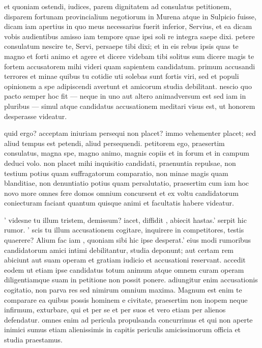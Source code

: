  et quoniam ostendi, iudices, parem dignitatem ad consulatus petitionem, disparem fortunam provincialium negotiorum in Murena atque in Sulpicio fuisse, dicam iam apertius in quo meus necessarius fuerit inferior, Servius, et ea dicam vobis audientibus amisso iam tempore quae ipsi soli re integra saepe dixi. petere consulatum nescire te, Servi, persaepe tibi dixi; et in eis rebus ipsis quas te magno et forti animo et agere et dicere videbam tibi solitus sum dicere magis te fortem accusatorem mihi videri quam sapientem candidatum. primum accusandi terrores et minae quibus tu cotidie uti solebas sunt fortis viri, sed et populi opinionem a spe adipiscendi avertunt et amicorum studia debilitant. nescio quo pacto semper hoc fit — neque in uno aut altero animadversum est sed iam in pluribus — simul atque candidatus accusationem meditari visus est, ut honorem desperasse videatur.

 quid ergo? acceptam iniuriam persequi non placet? immo vehementer placet; sed aliud tempus est petendi, aliud persequendi. petitorem ego, praesertim consulatus, magna spe, magno animo, magnis copiis et in forum et in campum deduci volo. non placet mihi inquisitio candidati, praenuntia repulsae, non testium potius quam suffragatorum comparatio, non minae magis quam blanditiae, non denuntiatio potius quam persalutatio, praesertim cum iam hoc novo more omnes fere domos omnium concursent et ex voltu candidatorum coniecturam faciant quantum quisque animi et facultatis habere videatur.

 ' videsne tu illum tristem, demissum? iacet, diffidit , abiecit hastas.' serpit hic rumor. ' scis tu illum accusationem cogitare, inquirere in competitores, testis quaerere? Alium fac iam , quoniam sibi hic ipse desperat.' eius modi rumoribus candidatorum amici intimi debilitantur, studia deponunt; aut certam rem abiciunt aut suam operam et gratiam iudicio et accusationi reservant. accedit eodem ut etiam ipse candidatus totum animum atque omnem curam operam diligentiamque suam in petitione non possit ponere. adiungitur enim accusationis cogitatio, non parva res sed nimirum omnium maxima. Magnum est enim te comparare ea quibus possis hominem e civitate, praesertim non inopem neque infirmum, exturbare, qui et per se et per suos et vero etiam per alienos defendatur. omnes enim ad pericula propulsanda concurrimus et qui non aperte inimici sumus etiam alienissimis in capitis periculis amicissimorum officia et studia praestamus.

